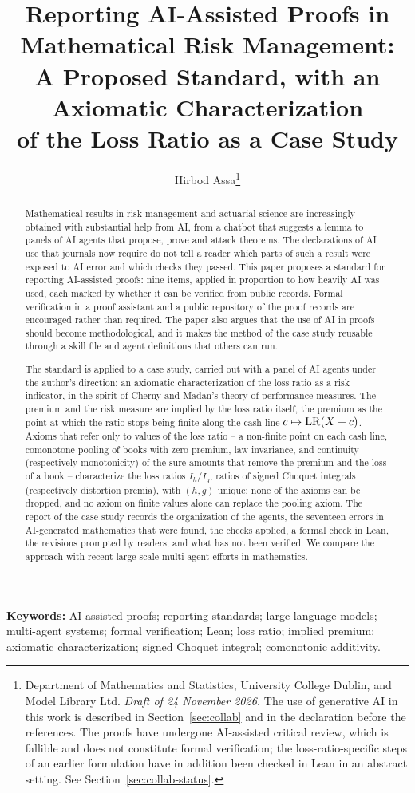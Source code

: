\documentclass[11pt,a4paper]{article}
\title{\textbf{Reporting AI-Assisted Proofs in Mathematical Risk Management:\\[2pt]
  A Proposed Standard, with an Axiomatic Characterization\\[2pt] of the Loss Ratio as a Case Study}}
\author{Hirbod Assa\thanks{Department of Mathematics and Statistics, University College Dublin, and
  Model Library Ltd.
  \emph{Draft of 24 November 2026.} The use of generative AI in this work is described in Section~\ref{sec:collab}
  and in the declaration before the references. The proofs have undergone AI-assisted critical review, which is
  fallible and does not constitute formal verification; the loss-ratio-specific steps of an earlier formulation
  have in addition been checked in Lean in an abstract setting. See Section~\ref{sec:collab-status}.}}
\date{}
\begin{document}
\maketitle

\begin{abstract}
\noindent
Mathematical results in risk management and actuarial science are increasingly obtained with substantial help from
AI, from a chatbot that suggests a lemma to panels of AI agents that propose, prove and attack theorems. The
declarations of AI use that journals now require do not tell a reader which parts of such a result were exposed to
AI error and which checks they passed. This paper proposes a standard for reporting AI-assisted proofs: nine items,
applied in proportion to how heavily AI was used, each marked by whether it can be verified from public records.
Formal verification in a proof assistant and a
public repository of the proof records are encouraged rather than required. The paper also argues that the use of
AI in proofs should become methodological, and it makes the method of the case study reusable through a skill file
and agent definitions that others can run.

The standard is applied to a case study, carried out with a panel of AI agents under the author's direction: an
axiomatic characterization of the loss ratio as a risk indicator, in the spirit of Cherny and Madan's theory of
performance measures. The premium and the risk measure are implied by the loss ratio itself, the premium as the
point at which the ratio stops being finite along the cash line $c\mapsto\mathrm{LR}(X+c)$. Axioms that refer only to values
of the loss ratio -- a non-finite point on each cash line, comonotone pooling of books with zero premium, law
invariance, and continuity (respectively monotonicity) of the sure amounts that remove the premium and the loss of a
book -- characterize the loss ratios $I_h/I_g$, ratios of signed Choquet integrals (respectively distortion premia),
with $(h,g)$ unique; none of the axioms can be dropped, and no axiom on finite values alone can replace the pooling
axiom. The report of the case study records the organization of the agents, the seventeen errors in AI-generated
mathematics that were found, the checks applied, a formal check in Lean, the revisions prompted by readers, and
what has not been verified. We compare the approach with recent large-scale multi-agent efforts in mathematics.
\end{abstract}

\noindent\textbf{Keywords:} AI-assisted proofs; reporting standards; large language models; multi-agent systems;
formal verification; Lean; loss ratio; implied premium; axiomatic characterization; signed Choquet integral;
comonotonic additivity.














\end{document}
